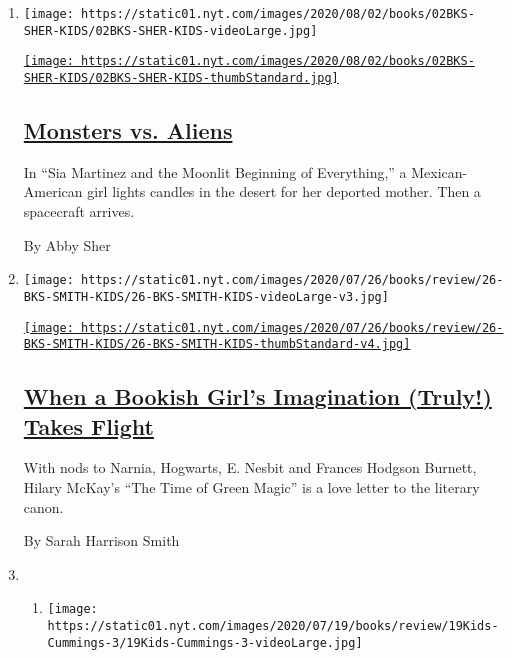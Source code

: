 \begin{enumerate}
\def\labelenumi{\arabic{enumi}.}
\item
  \texttt{[image: https://static01.nyt.com/images/2020/08/02/books/02BKS-SHER-KIDS/02BKS-SHER-KIDS-videoLarge.jpg]}

  \href{/2020/07/31/books/review/sia-martinez-and-the-moonlit-beginning-of-everything-raquel-vasquez-gilliland.html}{\texttt{[image: https://static01.nyt.com/images/2020/08/02/books/02BKS-SHER-KIDS/02BKS-SHER-KIDS-thumbStandard.jpg]}}

  \hypertarget{monsters-vs-aliens}{%
  \subsection{\texorpdfstring{\href{/2020/07/31/books/review/sia-martinez-and-the-moonlit-beginning-of-everything-raquel-vasquez-gilliland.html}{Monsters
  vs. Aliens}}{Monsters vs. Aliens}}\label{monsters-vs-aliens}}

  In ``Sia Martinez and the Moonlit Beginning of Everything,'' a
  Mexican-American girl lights candles in the desert for her deported
  mother. Then a spacecraft arrives.

  By Abby Sher
\item
  \texttt{[image: https://static01.nyt.com/images/2020/07/26/books/review/26-BKS-SMITH-KIDS/26-BKS-SMITH-KIDS-videoLarge-v3.jpg]}

  \href{/2020/07/24/books/review/hilary-mckay-the-time-of-green-magic.html}{\texttt{[image: https://static01.nyt.com/images/2020/07/26/books/review/26-BKS-SMITH-KIDS/26-BKS-SMITH-KIDS-thumbStandard-v4.jpg]}}

  \hypertarget{when-a-bookish-girls-imagination-truly-takes-flight}{%
  \subsection{\texorpdfstring{\href{/2020/07/24/books/review/hilary-mckay-the-time-of-green-magic.html}{When
  a Bookish Girl's Imagination (Truly!) Takes
  Flight}}{When a Bookish Girl's Imagination (Truly!) Takes Flight}}\label{when-a-bookish-girls-imagination-truly-takes-flight}}

  With nods to Narnia, Hogwarts, E. Nesbit and Frances Hodgson Burnett,
  Hilary McKay's ``The Time of Green Magic'' is a love letter to the
  literary canon.

  By Sarah Harrison Smith
\item
  \begin{enumerate}
  \def\labelenumii{\arabic{enumii}.}
  \item
    \texttt{[image: https://static01.nyt.com/images/2020/07/19/books/review/19Kids-Cummings-3/19Kids-Cummings-3-videoLarge.jpg]}


\end{enumerate}
\end{enumerate}
